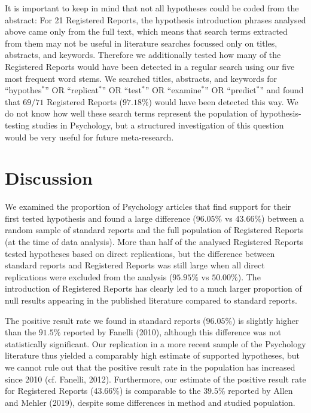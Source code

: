 \documentclass[british,,jou,floatsintext]{apa6}
\begin{document}
It is important to keep in mind that not all hypotheses could be coded from the abstract: For 21 Registered Reports, the hypothesis introduction phrases analysed above came only from the full text, which means that search terms extracted from them may not be useful in literature searches focussed only on titles, abstracts, and keywords.
Therefore we additionally tested how many of the Registered Reports would have been detected in a regular search using our five most frequent word stems.
We searched titles, abstracts, and keywords for \enquote{hypothes\(^\ast\)} OR \enquote{replicat\(^\ast\)} OR \enquote{test\(^\ast\)} OR \enquote{examine\(^\ast\)} OR \enquote{predict\(^\ast\)} and found that \(69/71\) Registered Reports (\(97.18 \%\)) would have been detected this way.
We do not know how well these search terms represent the population of hypothesis-testing studies in Psychology, but a structured investigation of this question would be very useful for future meta-research.

\hypertarget{discussion}{%
\section{Discussion}\label{discussion}}

We examined the proportion of Psychology articles that find support for their first tested hypothesis and found a large difference (\(96.05 \%\) vs \(43.66 \%\)) between a random sample of standard reports and the full population of Registered Reports (at the time of data analysis).
More than half of the analysed Registered Reports tested hypotheses based on direct replications, but the difference between standard reports and Registered Reports was still large when all direct replications were excluded from the analysis (\(95.95 \%\) vs \(50.00 \%\)).
The introduction of Registered Reports has clearly led to a much larger proportion of null results appearing in the published literature compared to standard reports.

The positive result rate we found in standard reports (\(96.05 \%\)) is slightly higher than the \(91.5\%\) reported by Fanelli (2010), although this difference was not statistically significant.
Our replication in a more recent sample of the Psychology literature thus yielded a comparably high estimate of supported hypotheses, but we cannot rule out that the positive result rate in the population has increased since 2010 (cf. Fanelli, 2012).
Furthermore, our estimate of the positive result rate for Registered Reports (\(43.66 \%\)) is comparable to the \(39.5\%\) reported by Allen and Mehler (2019), despite some differences in method and studied population.
\end{document}
